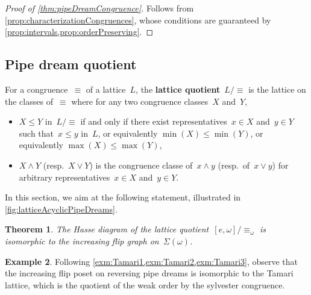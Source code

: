 \documentclass[reqno]{amsart}
\newtheorem{theorem}{Theorem}[section]
\theoremstyle{definition}
\newtheorem{example}[theorem]{Example}
\newcommand{\defn}[1]{\textbf{\textsf{\color{PineGreen} #1}}} %
\newcommand{\acyclicPipeDreams}{\Sigma} %
\newcommand{\meet}{\wedge} %
\newcommand{\join}{\vee} %
\begin{document}
\begin{proof}[Proof of \cref{thm:pipeDreamCongruence}]
Follows from \cref{prop:characterizationCongruences}, whose conditions are guaranteed by \cref{prop:intervals,prop:orderPreserving}.
\end{proof}


\subsection{Pipe dream quotient}
\label{subsec:pipeDreamQuotient}

For a congruence~$\equiv$ of a lattice~$L$, the \defn{lattice quotient}~$L/{\equiv}$ is the lattice on the classes of~$\equiv$ where for any two congruence classes~$X$ and~$Y$, 
\begin{itemize}
\item $X \le Y$ in~$L/{\equiv}$ if and only if there exist representatives~$x \in X$ and~$y \in Y$ such that~$x \le y$ in~$L$, or equivalently $\min(X) \le \min(Y)$, or equivalently $\max(X) \le \max(Y)$,
\item $X \meet Y$ (resp.~$X \join Y$) is the congruence classe of~$x \meet y$ (resp.~of~$x \join y$) for arbitrary representatives~$x \in X$ and~$y \in Y$.
\end{itemize}
In this section, we aim at the following statement, illustrated in \cref{fig:latticeAcyclicPipeDreams}.

\begin{theorem}
\label{thm:pipeDreamQuotient}
The Hasse diagram of the lattice quotient~$[e,\omega]/{\equiv_\omega}$ is isomorphic to the increasing flip graph on~$\acyclicPipeDreams(\omega)$.
\end{theorem}

\begin{example}
\label{exm:Tamari4}
Following \cref{exm:Tamari1,exm:Tamari2,exm:Tamari3}, observe that the increasing flip poset on reversing pipe dreams is isomorphic to the Tamari lattice, which is the quotient of the weak order by the sylvester congruence.
\end{example}
\end{document}
